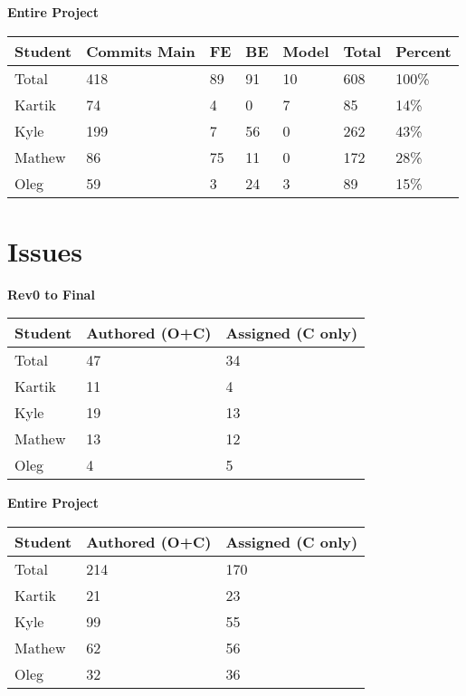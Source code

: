 \documentclass{article}
\begin{document}
\begin{table}[H]
    \centering
    \textbf{Entire Project}\\
    \begin{tabular}{lllllll}
    \toprule
    \textbf{Student} & \textbf{Commits Main} & \textbf{FE} & \textbf{BE} & \textbf{Model} & \textbf{Total}& \textbf{Percent}\\
    \midrule
    Total & 418 & 89 & 91 & 10 & 608 & 100\% \\
    Kartik & 74 & 4 & 0 & 7 & 85 & 14\%\\
    Kyle   & 199 & 7 & 56 & 0 & 262 & 43\%\\
    Mathew & 86 & 75 & 11 & 0 & 172 & 28\% \\
    Oleg   & 59 &  3 & 24 & 3 & 89 & 15\% \\
    \bottomrule
    \end{tabular}
\end{table}




\section{Issues} 
\begin{table}[H]
\centering
\textbf{Rev0 to Final}\\
\begin{tabular}{lll}
\toprule
\textbf{Student} & \textbf{Authored (O+C)} & \textbf{Assigned (C only)}\\
\midrule
Total & 47 & 34 \\
Kartik & 11 & 4\\
Kyle   & 19 & 13\\
Mathew & 13 & 12\\
Oleg   & 4 & 5\\
\bottomrule
\end{tabular}
\end{table}


\begin{table}[H]
\centering
\textbf{Entire Project}\\
\begin{tabular}{lll}
\toprule
\textbf{Student} & \textbf{Authored (O+C)} & \textbf{Assigned (C only)}\\
\midrule
Total & 214 & 170 \\
Kartik & 21 & 23\\
Kyle   & 99 & 55\\
Mathew & 62 & 56\\
Oleg   & 32 & 36\\
\bottomrule
\end{tabular}
\end{table}
\end{document}
